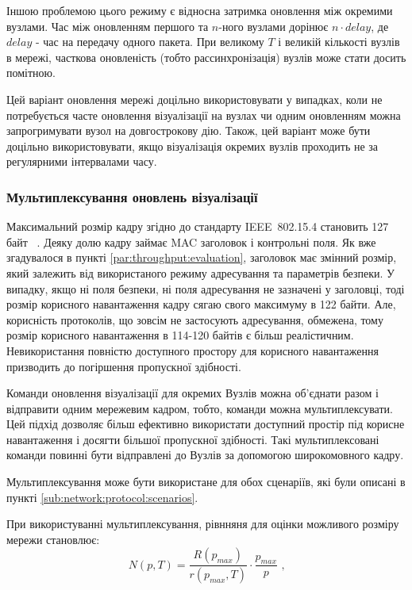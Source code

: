 \documentclass[a4paper,ukrainian,utf8,nocolumnsxix,floatsection,equationsection]{eskdtext}
\renewcommand\paragraph{\subsubsection}
\newcommand{\iee}[0]{IEEE~802.15.4\xspace}
\begin{document}
Іншою проблемою цього режиму є відносна затримка оновлення між окремими вузлами. Час між оновленням першого та $n$-ного вузлами дорінює $n \cdot delay$, де $delay$ - час на передачу одного пакета. При великому $T$ і великій кількості вузлів в мережі, часткова оновленість (тобто рассинхронізація) вузлів може стати досить помітною.

Цей варіант оновлення мережі доцільно використовувати у випадках, коли не потребується часте оновлення візуалізації на вузлах чи одним оновленням можна запрогримувати вузол на довгострокову дію. Також, цей варіант може бути доцільно використовувати, якщо візуалізація окремих вузлів проходить не за регулярними інтервалами часу.

\paragraph{Мультиплексування оновлень візуалізації}

Максимальний розмір кадру згідно до стандарту \iee становить 127 байт ~\cite{ieee:802:15:4:2011}. Деяку долю кадру займає MAC заголовок і контрольні поля. Як вже згадувалося в пункті \ref{par:throughput:evaluation}, заголовок має змінний розмір, який залежить від використаного режиму адресування та параметрів безпеки. У випадку, якщо ні поля безпеки, ні поля адресування не зазначені у заголовці, тоді розмір корисного навантаження кадру сягаю свого максимуму в 122 байти. Але, корисність протоколів, що зовсім не застосують адресування, обмежена, тому розмір корисного навантаження в 114-120 байтів є більш реалістичним. Невикористання повністю доступного простору для корисного навантаження призводить до погіршення пропускної здібності.

Команди оновлення візуалізації для окремих Вузлів можна об’єднати разом і відправити одним мережевим кадром, тобто, команди можна мультиплексувати. Цей підхід дозволяє більш ефективно використати доступний простір під корисне навантаження і досягти більшої пропускної здібності. Такі мультиплексовані команди повинні бути відправлені до Вузлів за допомогою широкомовного кадру.

Мультиплексування може бути використане для обох сценаріїв, які були описані в пункті \ref{sub:network:protocol:scenarios}.

При використуванні мультиплексування, рівнняня для оцінки можливого розміру мережи становлює:
\begin{equation}\label{eq:net:size:multiplex:send}
	N(p, T) = \frac{R(p_{max})}{r(p_{max}, T)} \cdot \frac{p_{max}}{p} \text{ ,}
\end{equation}
\end{document}
